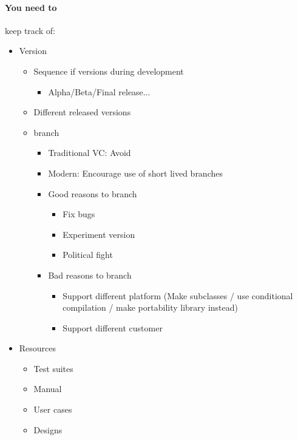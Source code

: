 \documentclass[12pt]{article}
\begin{document}
    \paragraph{You need to} keep track of:
        \begin{itemize}
            \item Version
                \begin{itemize}
                    \item Sequence if versions during development
                    \begin{itemize}
                        \item Alpha/Beta/Final release...
                    \end{itemize}
                    \item Different released versions
                    \item branch
                    \begin{itemize}
                        \item Traditional VC: Avoid
                        \item Modern: Encourage use of short lived branches
                        \item Good reasons to branch
                            \begin{itemize}
                                \item Fix bugs
                                \item Experiment version
                                \item Political fight
                            \end{itemize}
                        \item Bad reasons to branch
                            \begin{itemize}
                                \item Support different platform (Make subclasses / use conditional compilation / make portability library instead)
                                \item Support different customer
                            \end{itemize}
                    \end{itemize}
                \end{itemize}
            \item Resources
                \begin{itemize}
                    \item Test suites
                    \item Manual
                    \item User cases
                    \item Designs
                \end{itemize}
        \end{itemize}
\end{document}
